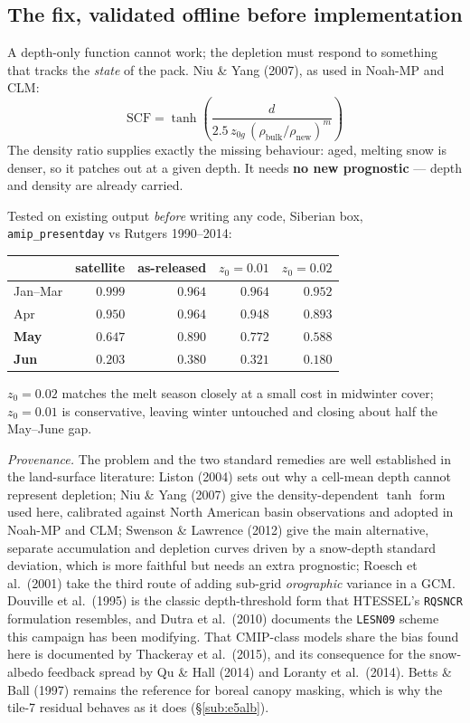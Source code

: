\documentclass[10pt]{article}
\begin{document}
\subsection{The fix, validated offline before implementation}\label{sub:scffix}
A depth-only function cannot work; the depletion must respond to something that
tracks the \emph{state} of the pack. Niu \& Yang (2007), as used in Noah-MP and CLM:
\[ \mathrm{SCF} = \tanh\!\left(\frac{d}{2.5\,z_{0g}\,(\rho_{\mathrm{bulk}}/\rho_{\mathrm{new}})^{m}}\right) \]
The density ratio supplies exactly the missing behaviour: aged, melting snow is
denser, so it patches out at a given depth. It needs \textbf{no new prognostic} ---
depth and density are already carried.

Tested on existing output \emph{before} writing any code, Siberian box,
\texttt{amip\_presentday} vs Rutgers 1990--2014:

\begin{center}\footnotesize
\begin{tabular}{l r r r r}
\toprule
 & satellite & as-released & $z_0=0.01$ & $z_0=0.02$ \\
\midrule
Jan--Mar & $0.999$ & $0.964$ & $0.964$ & $0.952$ \\
Apr & $0.950$ & $0.964$ & $0.948$ & $0.893$ \\
\textbf{May} & $\mathbf{0.647}$ & $0.890$ & $0.772$ & $\mathbf{0.588}$ \\
\textbf{Jun} & $\mathbf{0.203}$ & $0.380$ & $0.321$ & $\mathbf{0.180}$ \\
\bottomrule
\end{tabular}
\end{center}

\noindent $z_0 = 0.02$ matches the melt season closely at a small cost in midwinter
cover; $z_0 = 0.01$ is conservative, leaving winter untouched and closing about half
the May--June gap.

\emph{Provenance.} The problem and the two standard remedies are well established in the
land-surface literature: Liston (2004) sets out why a cell-mean depth cannot represent
depletion; Niu \& Yang (2007) give the density-dependent $\tanh$ form used here, calibrated
against North American basin observations and adopted in Noah-MP and CLM; Swenson \&
Lawrence (2012) give the main alternative, separate accumulation and depletion curves driven
by a snow-depth standard deviation, which is more faithful but needs an extra prognostic;
Roesch et al.\ (2001) take the third route of adding sub-grid \emph{orographic} variance in a
GCM. Douville et al.\ (1995) is the classic depth-threshold form that HTESSEL's
\texttt{RQSNCR} formulation resembles, and Dutra et al.\ (2010) documents the \texttt{LESN09}
scheme this campaign has been modifying. That CMIP-class models share the bias found here is
documented by Thackeray et al.\ (2015), and its consequence for the snow-albedo feedback
spread by Qu \& Hall (2014) and Loranty et al.\ (2014). Betts \& Ball (1997) remains the
reference for boreal canopy masking, which is why the tile-7 residual behaves as it does
(\S\ref{sub:e5alb}).
\end{document}
